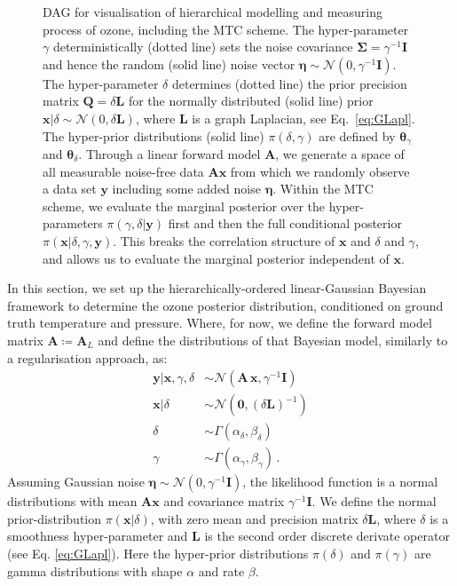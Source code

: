 \begin{figure}[htb!]
\begin{tikzpicture}
	\end{tikzpicture} 
	\caption[Directed acyclic graph for ozone retrieval and MTC scheme.]{DAG for visualisation of hierarchical modelling and measuring process of ozone, including the MTC scheme. The hyper-parameter $\gamma$ deterministically (dotted line) sets the noise covariance $\bm{\Sigma} = \gamma^{-1}\bm{I}$ and hence the random (solid line) noise vector $\bm{\eta} \sim \mathcal{N}(0, \gamma^{-1}\bm{I})$.
	The hyper-parameter $\delta$ determines (dotted line) the prior precision matrix $\bm{Q} = \delta \bm{L}$ for the normally distributed (solid line) prior $\bm{x}| \delta \sim \mathcal{N}(0, \delta \bm{L})$, where $\bm{L}$ is a graph Laplacian, see Eq.~\ref{eq:GLapl}.
	The hyper-prior distributions (solid line) $\pi(\delta, \gamma)$ are defined by $\bm{\theta}_{\gamma}$ and $\bm{\theta}_{\delta}$.
	Through a linear forward model $\bm{A}$, we generate a space of all measurable noise-free data $\bm{A}\bm{x}$ from which we randomly observe a data set $\bm{y}$ including some added noise $\bm{\eta}$.
	Within the MTC scheme, we evaluate the marginal posterior over the hyper-parameters $\pi(\gamma, \delta | \bm{y})$ first and then the full conditional posterior $\pi(\bm{x}|\delta,\gamma,\bm{y})$. This breaks the correlation structure of $\bm{x}$ and $\delta$ and $\gamma$, and allows us to evaluate the marginal posterior independent of $\bm{x}$.}
	\label{fig:DAGO3}
\end{figure}
In this section, we set up the hierarchically-ordered linear-Gaussian Bayesian framework to determine the ozone posterior distribution, conditioned on ground truth temperature and pressure.
Where, for now, we define the forward model matrix $\bm{A} \coloneqq \bm{A}_L$ and define the distributions of that Bayesian model, similarly to a regularisation approach, as:
\begin{subequations}
	\begin{align}
		\bm{y} |  \bm{x},\gamma,\delta  &\sim \mathcal{N}(\bm{A} \, \bm{x}, \gamma^{-1} \bm{I}) \label{eq:likelihoodAppl} \\
		\bm{x}| \delta  &\sim \mathcal{N}(\bm{0}, (\delta \bm{L})^{-1} ) \label{eq:priorXAppl} \\
		\delta  &\sim \Gamma(\alpha_{\delta}, \beta_{\delta})\label{eq:priorDelAppl} \\
		\gamma  &\sim \Gamma(\alpha_{\gamma}, \beta_{\gamma})\label{eq:priorGamAppl} \, .
	\end{align} 
	\label{eq:O3BayMode}
\end{subequations}
Assuming Gaussian noise $\bm{\eta} \sim \mathcal{N}(0, \gamma^{-1} \bm{I})$, the likelihood function is a normal distributions with mean $\bm{A} \bm{x}$ and covariance matrix $\gamma^{-1} \bm{I}$.
We define the normal prior-distribution $\pi(\bm{x}|\delta)$, with zero mean and precision matrix $\delta \bm{L}$, where $\delta$ is a smoothness hyper-parameter and $\bm{L}$ is the second order discrete derivate operator (see Eq. \ref{eq:GLapl}).
Here the hyper-prior distributions $\pi(\delta)$ and $\pi(\gamma)$ are gamma distributions with shape $\alpha$ and rate $\beta$.

